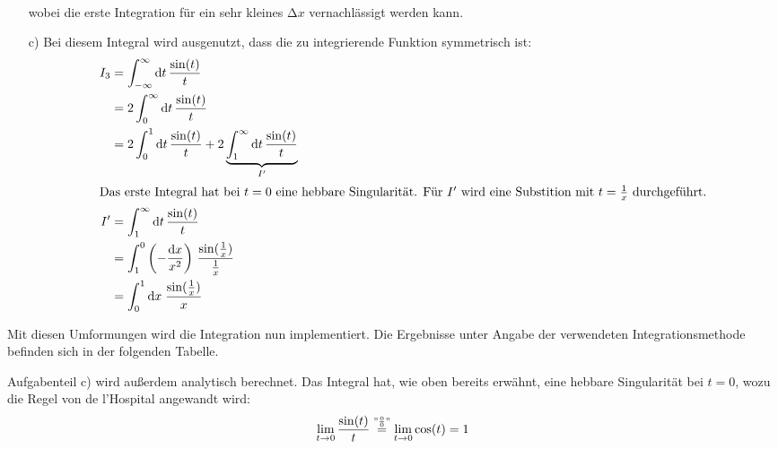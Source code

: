 \begin{itemize}[leftmargin=*]
\begin{align*}
          \end{align*}
          wobei die erste Integration für ein sehr kleines $\increment x$ vernachlässigt werden kann.
\item[c)] Bei diesem Integral wird ausgenutzt, dass die zu integrierende Funktion symmetrisch ist:
          \begin{align*}
          I_3 &= \int_{-\infty}^{\infty} \text{d} t \, \frac{\sin (t)}{t} \\
              &= 2 \int_{0}^{\infty} \text{d} t \, \frac{\sin (t)}{t} \\
              &= 2 \int_{0}^{1} \text{d} t \, \frac{\sin (t)}{t} + 2 \underbrace{\int_{1}^{\infty} \text{d} t \, \frac{\sin (t)}{t}}_{I'} \\
          \intertext{Das erste Integral hat bei $t=0$ eine hebbare Singularität. Für $I'$ wird eine Substition mit $t = \frac{1}{x}$ durchgeführt.}
          I' &= \int_{1}^{\infty} \text{d} t \, \frac{\sin (t)}{t} \\
             &= \int_{1}^{0}  \left(- \frac{\text{d} x}{x^2}\right) \, \frac{\sin (\frac{1}{x})}{\frac{1}{x}} \\
             &= \int_{0}^{1} \text{d} x \; \frac{\sin (\frac{1}{x})}{x}
          \end{align*}
\end{itemize}
Mit diesen Umformungen wird die Integration nun implementiert. Die Ergebnisse unter Angabe der verwendeten Integrationsmethode
befinden sich in der folgenden Tabelle.
\FloatBarrier
\begin{table}[h]
    \centering
		\label{tab:tab1}
		\caption{Ergebnisse der Berechnung der einzelen Integrale.}
\end{table}
\FloatBarrier
\noindent
Aufgabenteil c) wird außerdem analytisch berechnet. Das Integral hat, wie oben bereits erwähnt, eine hebbare Singularität
bei $t = 0$, wozu die Regel von de l'Hospital angewandt wird:
\begin{equation*}
  \lim_{t \to 0} \frac{\sin (t)}{t} \stackrel{"\frac{0}{0}"}{=} \lim_{t \to 0} \cos (t) = 1
\end{equation*}
